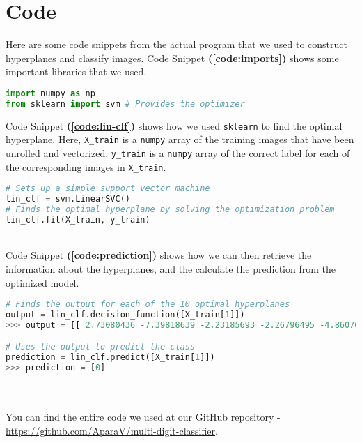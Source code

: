 \section{Code}
\label{appendix:code}

Here are some code snippets from the actual program that we used to construct hyperplanes and classify images. Code Snippet \textbf{(\ref{code:imports})} shows some important libraries that we used.

\begin{lstlisting}[caption={Importing important libraries}, label={code:imports}, language=Python]
import numpy as np
from sklearn import svm # Provides the optimizer
\end{lstlisting}

Code Snippet \textbf{(\ref{code:lin-clf})} shows how we used \texttt{sklearn} to find the optimal hyperplane. Here, \texttt{X\_train} is a \texttt{numpy} array of the training images that have been unrolled and vectorized. \texttt{y\_train} is a \texttt{numpy} array of the correct label for each of the corresponding images in \texttt{X\_train}.

\begin{lstlisting}[caption={Creating and optmizing the support vector machine}, label={code:lin-clf}, language=Python]
# Sets up a simple support vector machine
lin_clf = svm.LinearSVC()
# Finds the optimal hyperplane by solving the optimization problem
lin_clf.fit(X_train, y_train)
\end{lstlisting}
~\\
Code Snippet \textbf{(\ref{code:prediction})} shows how we can then retrieve the information about the hyperplanes, and the calculate the prediction from the optimized model.

\begin{lstlisting}[caption={Predicting the class}, label={code:prediction}, language=Python]
# Finds the output for each of the 10 optimal hyperplanes
output = lin_clf.decision_function([X_train[1]])
>>> output = [[ 2.73080436 -7.39818639 -2.23185693 -2.26796495 -4.86076138 -2.20572871 -3.33931763 -4.9160509  -2.51609689 -3.23372526 ]]

# Uses the output to predict the class
prediction = lin_clf.predict([X_train[1]])
>>> prediction = [0]
\end{lstlisting}
~\\ \\
You can find the entire code we used at our GitHub repository - \url{https://github.com/AparaV/multi-digit-classifier}.